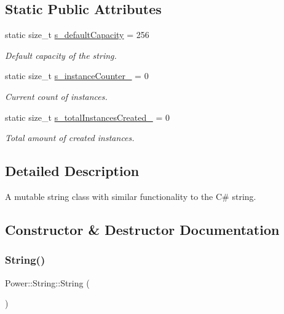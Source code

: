 \subsection*{Static Public Attributes}
\begin{DoxyCompactItemize}
\item 
static size\+\_\+t \hyperlink{class_power_1_1_string_a9ffb47096926f8bf69666dae8cd4e92e}{s\+\_\+default\+Capacity} = 256
\begin{DoxyCompactList}\small\item\em Default capacity of the string. \end{DoxyCompactList}\item 
static size\+\_\+t \hyperlink{class_power_1_1_string_af0eb9ed7cf032a152135aae322389977}{s\+\_\+instance\+Counter\+\_\+} = 0
\begin{DoxyCompactList}\small\item\em Current count of instances. \end{DoxyCompactList}\item 
static size\+\_\+t \hyperlink{class_power_1_1_string_a629d518a942c2d23c44f509fea885cb5}{s\+\_\+total\+Instances\+Created\+\_\+} = 0
\begin{DoxyCompactList}\small\item\em Total amount of created instances. \end{DoxyCompactList}\end{DoxyCompactItemize}


\subsection{Detailed Description}
A mutable string class with similar functionality to the C\# string. 

\subsection{Constructor \& Destructor Documentation}
\mbox{\label{class_power_1_1_string_a3ae78cdde9e4e81b420277b5581fee8a}} 
\subsubsection{\texorpdfstring{String()}{String()}\hspace{0.1cm}{\footnotesize\ttfamily [1/7]}}
{\footnotesize\ttfamily Power\+::\+String\+::\+String (\begin{DoxyParamCaption}{ }\end{DoxyParamCaption})\hspace{0.3cm}{\ttfamily [inline]}}



